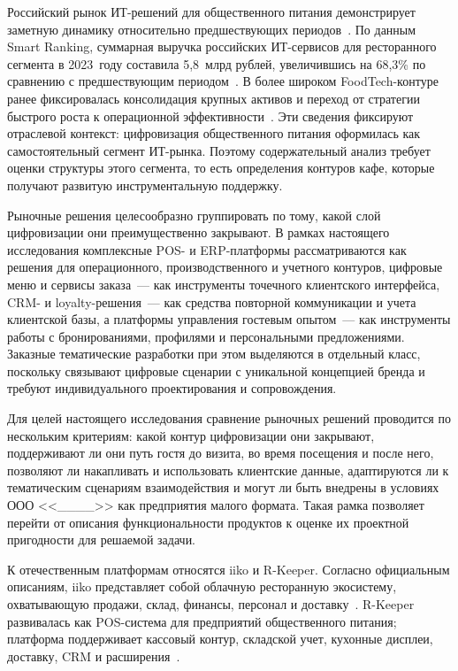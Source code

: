 Российский рынок ИТ-решений для общественного питания демонстрирует заметную динамику относительно предшествующих периодов~\cite{smartranking2024, smartranking2022}. По данным Smart Ranking, суммарная выручка российских ИТ-сервисов для ресторанного сегмента в 2023~году составила 5,8~млрд рублей, увеличившись на 68,3\% по сравнению с предшествующим периодом~\cite{smartranking2024}. В более широком FoodTech-контуре ранее фиксировалась консолидация крупных активов и переход от стратегии быстрого роста к операционной эффективности~\cite{smartranking2022}. Эти сведения фиксируют отраслевой контекст: цифровизация общественного питания оформилась как самостоятельный сегмент ИТ-рынка. Поэтому содержательный анализ требует оценки структуры этого сегмента, то есть определения контуров кафе, которые получают развитую инструментальную поддержку.

Рыночные решения целесообразно группировать по тому, какой слой цифровизации они преимущественно закрывают. В рамках настоящего исследования комплексные POS- и ERP-платформы рассматриваются как решения для операционного, производственного и учетного контуров, цифровые меню и сервисы заказа~--- как инструменты точечного клиентского интерфейса, CRM- и loyalty-решения~--- как средства повторной коммуникации и учета клиентской базы, а платформы управления гостевым опытом~--- как инструменты работы с бронированиями, профилями и персональными предложениями. Заказные тематические разработки при этом выделяются в отдельный класс, поскольку связывают цифровые сценарии с уникальной концепцией бренда и требуют индивидуального проектирования и сопровождения.

Для целей настоящего исследования сравнение рыночных решений проводится по нескольким критериям: какой контур цифровизации они закрывают, поддерживают ли они путь гостя до визита, во время посещения и после него, позволяют ли накапливать и использовать клиентские данные, адаптируются ли к тематическим сценариям взаимодействия и могут ли быть внедрены в условиях ООО <<\_\_\_\_>> как предприятия малого формата. Такая рамка позволяет перейти от описания функциональности продуктов к оценке их проектной пригодности для решаемой задачи.

К отечественным платформам относятся iiko и R-Keeper. Согласно официальным описаниям, iiko представляет собой облачную ресторанную экосистему, охватывающую продажи, склад, финансы, персонал и доставку~\cite{iiko_official}. R-Keeper развивалась как POS-система для предприятий общественного питания; платформа поддерживает кассовый контур, складской учет, кухонные дисплеи, доставку, CRM и расширения~\cite{rkeeper_official, rkeeper_modules2026}.

